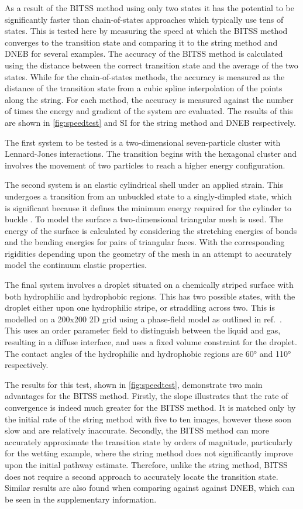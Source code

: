 \documentclass[aps,twocolumn]{revtex4}
\newcommand{\ccite}[1]{ref.~\cite{#1}}
\newcommand{\temp}[1]{{\leavevmode\color{red}#1}}
\begin{document}
As a result of the BITSS method using only two states it has the potential to be significantly faster than chain-of-states approaches which typically use tens of states.
This is tested here by measuring the speed at which the BITSS method converges to the transition state and comparing it to the string method and DNEB for several examples.
The accuracy of the BITSS method is calculated using the distance between the correct transition state and the average of the two states.
While for the chain-of-states methods, the accuracy is measured as the distance of the transition state from a cubic spline interpolation of the points along the string.
For each method, the accuracy is measured against the number of times the energy and gradient of the system are evaluated.
The results of this are shown in \cref{fig:speedtest} and \temp{SI} for the string method and DNEB respectively.

The first system to be tested is a two-dimensional seven-particle cluster with Lennard-Jones interactions.
The transition begins with the hexagonal cluster and involves the movement of two particles to reach a higher energy configuration.

The second system is an elastic cylindrical shell under an applied strain.
This undergoes a transition from an unbuckled state to a singly-dimpled state, which is significant because it defines the minimum energy required for the cylinder to buckle \cite{Panter2019}.
To model the surface a two-dimensional triangular mesh is used.
The energy of the surface is calculated by considering the stretching energies of bonds and the bending energies for pairs of triangular faces.
With the corresponding rigidities depending upon the geometry of the mesh in an attempt to accurately model the continuum elastic properties.

The final system involves a droplet situated on a chemically striped surface with both hydrophilic and hydrophobic regions.
This has two possible states, with the droplet either upon one hydrophilic stripe, or straddling across two.
This is modelled on a 200x200 2D grid using a phase-field model as outlined in \ccite{Panter2019b}.
This uses an order parameter field to distinguish between the liquid and gas, resulting in a diffuse interface, and uses a fixed volume constraint for the droplet.
The contact angles of the hydrophilic and hydrophobic regions are 60\si{\degree} and 110\si{\degree} respectively.

The results for this test, shown in \cref{fig:speedtest}, demonstrate two main advantages for the BITSS method.
Firstly, the slope illustrates that the rate of convergence is indeed much greater for the BITSS method.
It is matched only by the initial rate of the string method with five to ten images, however these soon slow and are relatively inaccurate.
Secondly, the BITSS method can more accurately approximate the transition state by orders of magnitude, particularly for the wetting example, where the string method does not significantly improve upon the initial pathway estimate.
Therefore, unlike the string method, BITSS does not require a second approach to accurately locate the transition state.
Similar results are also found when comparing against against DNEB, which can be seen in the supplementary information.
\end{document}
